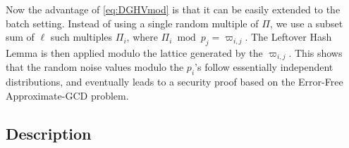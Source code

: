 \documentclass{llncs}
\begin{document}
Now the advantage of \eqref{eq:DGHVmod} is that it can be easily extended
to the batch setting. Instead of using a single random multiple of
$\varPi$, we use a subset sum of $\ell$ such multiples $\varPi_i$, where
$\varPi_i \bmod p_j=\varpi_{i,j}$. The Leftover Hash Lemma is then
applied modulo the lattice generated by the $\varpi_{i,j}$. This shows
that the random noise values modulo the $p_i$'s follow essentially
independent distributions, and eventually leads to a security proof based on the Error-Free Approximate-GCD problem. 

\subsection{Description}\label{subsec:description}
\end{document}
